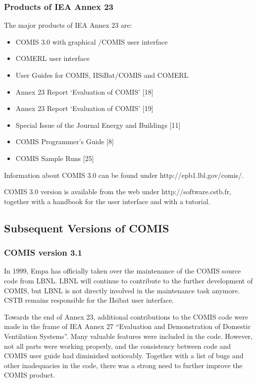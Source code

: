 \documentclass[10pt]{article}
\begin{document}
\subsubsection{Products of IEA Annex 23}

The major products of IEA Annex 23 are:

\begin{itemize}
\item COMIS 3.0 with graphical /COMIS user interface
\item COMERL user interface
\item User Guides for COMIS, IISiBat/COMIS and COMERL
\item Annex 23 Report `Evaluation of COMIS' [18]
\item Annex 23 Report `Evaluation of COMIS' [19]
\item Special Issue of the Journal Energy and Buildings [11]
\item COMIS Programmer's Guide [8]
\item COMIS Sample Runs [25]
\end{itemize}

Information about COMIS 3.0 can be found under http://epb1.lbl.gov/comis/. 

COMIS 3.0 version is available from the web under http://software.cstb.fr, together with a handbook for the user interface and with a tutorial. 

\subsection{Subsequent Versions of COMIS}

\subsubsection{COMIS version 3.1}

In 1999, Empa has officially taken over the maintenance of the COMIS source code from LBNL. LBNL will continue to contribute to the further development of COMIS, but LBNL is not directly involved in the maintenance task anymore. CSTB remains responsible for the IIsibat user interface.

Towards the end of Annex 23, additional contributions to the COMIS code were made in the frame of IEA Annex 27 ``Evaluation and Demonstration of Domestic Ventilation Systems''. Many valuable features were included in the code. However, not all parts were working properly, and the consistency between code and COMIS user guide had diminished noticeably. Together with a list of bugs and other inadequacies in the code, there was a strong need to further improve the COMIS product. 
\end{document}
